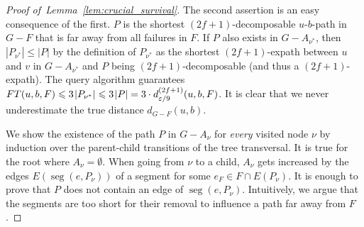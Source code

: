 \documentclass{article}\usepackage[a4paper,margin=20mm]{geometry}
\DeclareMathOperator{\seg}{seg}
\newcommand*{\length}[1]{|#1|}
\newcommand*{\nwspace}{\hspace*{.1em}}
\renewcommand{\le}{\leqslant}
\newcommand{\eps}{\varepsilon}
\begin{document}
\begin{proof}[Proof of~Lemma~\ref{lem:crucial_survival}]
  The second assertion is an easy consequence of the first.
  $P$ is the shortest $(2f{+}1)$-decomposable $u$-$b$-path in $G-F$ 
  that is far away from all failures in $F$.
  If $P$ also exists in $G-A_{\nu^*}$,
  then $\length{P_{\nu^*}} \le \length{P}$ by the definition of $P_{\nu^*}$
  as the shortest $(2f{+}1)$-expath between $u$ and $v$ in $G-A_{\nu^*}$
  and $P$ being $(2f{+}1)$-decomposable (and thus a $(2f{+}1)$-expath).
  The query algorithm guarantees
  $FT(u,b,F) \le 3 \nwspace \length{P_{\nu^*}} 
    \le 3 \nwspace \length{P} 
    = 3 \cdot d^{(2f+1)}_{\eps/9}(u,b,F)$.
  It is clear that we never underestimate the true distance $d_{G-F}(u,b)$.
  
  We show the existence of the path $P$ in $G-A_{\nu}$ for \emph{every} visited node $\nu$
  by induction over the parent-child transitions of the tree transversal.
  It is true for the root where $A_{\nu} = \emptyset$.
  When going from $\nu$ to a child, $A_{\nu}$ gets increased by
  the edges $E(\seg(e,P_{\nu}))$
  of a segment for some $e_F \in F \cap E(P_{\nu})$.
  It is enough to prove that $P$ does not contain an edge of $\seg(e,P_{\nu})$.
  Intuitively, we argue that the segments are too short
  for their removal to influence a path far away from $F$.
  

\end{proof}
\end{document}
